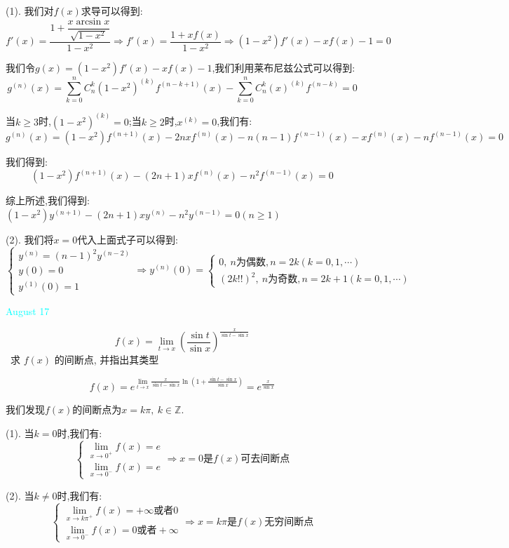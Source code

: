 \begin{solution}

	(1). 我们对$f(x)$求导可以得到:  
	$$f'(x)=\dfrac{1+\dfrac{x\arcsin x}{\sqrt{1-x^2}}}{1-x^2}\Rightarrow f'(x)=\dfrac{1+xf(x)}{1-x^2}\Rightarrow (1-x^2)f'(x)-xf(x)-1=0$$
	
	我们令$g(x)=(1-x^2)f'(x)-xf(x)-1$,我们利用莱布尼兹公式可以得到:  
	$$g^{(n)}(x)=\sum\limits_{k=0}^{n}C_{n}^{k}(1-x^2)^{(k)}f^{(n-k+1)}(x)-\sum\limits_{k=0}^{n}C_{n}^{k}(x)^{(k)}f^{(n-k)}=0$$
	
	当$k\geq 3$时,$(1-x^2)^{(k)}=0$;当$k\geq 2$时,$x^{(k)}=0$,我们有:  
	$$g^{(n)}(x)=(1-x^2)f^{(n+1)}(x)-2nxf^{(n)}(x)-n(n-1)f^{(n-1)}(x)-xf^{(n)}(x)-nf^{(n-1)}(x)=0$$
	
	我们得到:  
	$$(1-x^2)f^{(n+1)}(x)-(2n+1)xf^{(n)}(x)-n^2f^{(n-1)}(x)=0$$
	
	综上所述,我们得到:  $(1-x^2)y^{(n+1)}-(2n+1)xy^{(n)}-n^2y^{(n-1)}=0(n\geq 1)$
	
	(2). 我们将$x=0$代入上面式子可以得到:  
	$$\left\lbrace 
	\begin{array}{l}
		y^{(n)}=(n-1)^2y^{(n-2)}\\
		y(0)=0\\
		y^{(1)}(0)=1
	\end{array}
	\right. \Rightarrow y^{(n)}(0)=\left\lbrace 
	\begin{array}{l}
		0,\ n\text{为偶数},n=2k(k=0,1,\cdots)\\
		(2k!!)^2,\ n\text{为奇数},n=2k+1(k=0,1,\cdots)
	\end{array}
	\right. $$
\end{solution}


\textcolor{cyan}{August 17}

\begin{example}[][Exam: 34.3.5]
	$$f(x) = \lim\limits_{t\to x}\left(\dfrac{\sin t}{\sin x} \right)^{\frac{x}{\sin t-\sin x}}$$\
	求 $f(x)$ 的间断点, 并指出其类型
\end{example}

\begin{solution}

	$$f(x)=e^{\lim\limits_{t\to x}\frac{x}{\sin t-\sin x}\ln(1+\frac{\sin t-\sin x}{\sin x})}=e^{\frac{x}{\sin x}}$$
	
	我们发现$f(x)$的间断点为$x=k\pi,\ k\in\mathbb{Z}$.
	
	(1). 当$k=0$时,我们有:
	$$\left\lbrace 
	\begin{array}{l}
		\lim\limits_{x\to 0^{+}}f(x)=e\\
		\lim\limits_{x\to 0^{-}}f(x)=e
	\end{array}
	\right. \Rightarrow x=0\text{是}f(x)\text{可去间断点}$$
	
	(2). 当$k\neq 0$时,我们有:
	$$\left\lbrace 
	\begin{array}{l}
		\lim\limits_{x\to k\pi^{+}}f(x)=+\infty\text{或者}0\\
		\lim\limits_{x\to 0^{-}}f(x)=0\text{或者}+\infty
	\end{array}
	\right. \Rightarrow x=k\pi\text{是}f(x)\text{无穷间断点}$$
\end{solution}

